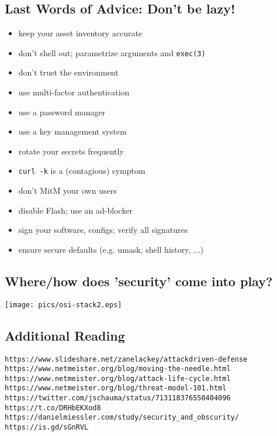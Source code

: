 \documentclass[xga]{xdvislides}
\begin{document}
\subsection{Last Words of Advice: Don't be lazy!}
\begin{itemize}
	\item keep your asset inventory accurate
	\item don't shell out; parametrize arguments and {\tt exec(3)}
	\item don't trust the environment
	\item use multi-factor authentication
	\item use a password manager
	\item use a key management system
	\item rotate your secrets frequently
	\item {\tt curl -k} is a (contagious) symptom
	\item don't MitM your own users
	\item disable Flash; use an ad-blocker
	\item sign your software, configs; verify all signatures
	\item ensure secure defaults (e.g. umask, shell history, ...)
\end{itemize}

\subsection{Where/how does 'security' come into play?}
\vspace*{\fill}
\begin{center}
	\texttt{[image: pics/osi-stack2.eps]} \\
\end{center}
\vspace*{\fill}

\subsection{Additional Reading}
\begin{verbatim}
https://www.slideshare.net/zanelackey/attackdriven-defense
https://www.netmeister.org/blog/moving-the-needle.html
https://www.netmeister.org/blog/attack-life-cycle.html
https://www.netmeister.org/blog/threat-model-101.html
https://twitter.com/jschauma/status/713118376550404096
https://t.co/DRHbEKXod8
https://danielmiessler.com/study/security_and_obscurity/
https://is.gd/sGnRVL
\end{verbatim}
\end{document}
